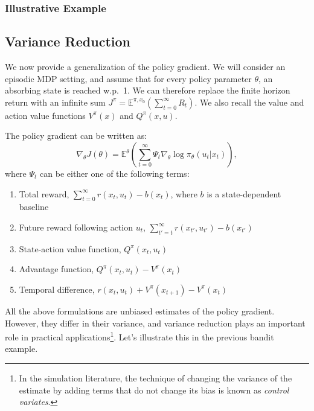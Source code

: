 \subsubsection{Illustrative Example}



\subsection{Variance Reduction}
We now provide a generalization of the policy gradient. We will consider an episodic MDP setting, and assume that for every policy parameter $\theta$, an absorbing state is reached w.p.~1. We can therefore replace the finite horizon return with an infinite sum ${J^\pi } = {\mathbb E^{\pi ,{x_0}}} \left(\sum\limits_{t = 0}^\infty {{R_t}} \right)$. We also recall the value and action value functions $V^\pi(x)$ and $Q^\pi(x,u)$. 
\begin{proposition}\label{prop:pg_control_variates}
The policy gradient can be written as:
\begin{equation*}
    \nabla_\theta J(\theta) = {\mathbb E^\theta }\left( \sum_{t=0}^\infty \Psi_t {{\nabla _\theta }\log {\pi _\theta }({u_t}|{x_t})} \right),
\end{equation*}
where $\Psi_t$ can be either one of the following terms:
\begin{enumerate}
    \item Total reward, $\sum_{t=0}^\infty r(x_t,u_t) - b(x_t)$, where $b$ is a state-dependent baseline
    \item Future reward following action $u_{t}$, $\sum_{t'=t}^\infty r(x_{t'},u_{t'}) - b(x_{t'})$
    \item State-action value function, $Q^\pi(x_t,u_t)$
    \item Advantage function, $Q^\pi(x_t,u_t) - V^\pi(x_t)$
    \item Temporal difference, $r(x_t,u_t) + V^\pi(x_{t+1})- V^\pi(x_t)$
\end{enumerate}
\end{proposition}

All the above formulations are unbiased estimates of the policy gradient. However, they differ in their variance, and variance reduction plays an important role in practical applications\footnote{In the simulation literature, the technique of changing the variance of the estimate by adding terms that do not change its bias is known as \textit{control variates}.}. Let's illustrate this in the previous bandit example.

